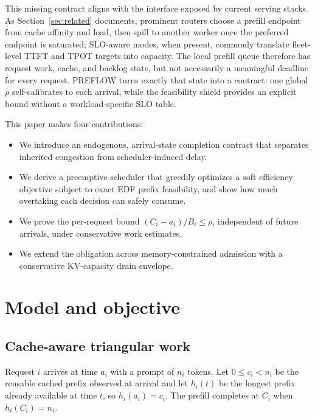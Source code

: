 \documentclass{article}
\newcommand{\preflow}{\textnormal{\textsc{PREFLOW}}}
\begin{document}
This missing contract aligns with the interface exposed by current serving
stacks.  As Section~\ref{sec:related} documents, prominent routers choose a
prefill endpoint from cache affinity and load, then spill to another worker once
the preferred endpoint is saturated; SLO-aware modes, when present, commonly
translate fleet-level TTFT and TPOT targets into capacity.  The local prefill
queue therefore has request work, cache, and backlog state, but not necessarily
a meaningful deadline for every request.  \preflow{} turns exactly that state
into a contract: one global $\rho$ self-calibrates to each arrival, while the
feasibility shield provides an explicit bound without a workload-specific SLO
table.

This paper makes four contributions:
\begin{itemize}
    \item We introduce an endogenous, arrival-state completion contract that
    separates inherited congestion from scheduler-induced delay.
    \item We derive a preemptive scheduler that greedily optimizes a soft
    efficiency objective subject to exact EDF prefix feasibility, and show how
    much overtaking each decision can safely consume.
    \item We prove the per-request bound
    $(C_i-a_i)/B_i\leq\rho$, independent of future arrivals, under conservative
    work estimates.
    \item We extend the obligation across memory-constrained admission with a
    conservative KV-capacity drain envelope.
\end{itemize}

\section{Model and objective}
\label{sec:model}

\subsection{Cache-aware triangular work}

Request $i$ arrives at time $a_i$ with a prompt of $n_i$ tokens.  Let
$0\leq c_i<n_i$ be the reusable cached prefix observed at arrival and let
$h_i(t)$ be the longest prefix already available at time $t$, so
$h_i(a_i)=c_i$.  The prefill completes at $C_i$ when $h_i(C_i)=n_i$.
\end{document}
